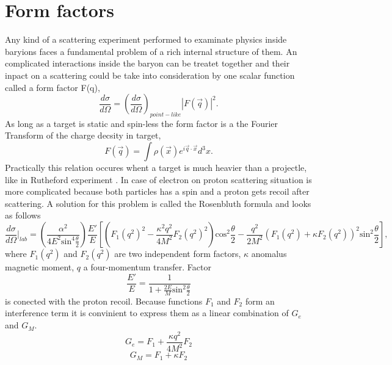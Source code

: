 \section{Form factors}
Any kind of a scattering experiment performed to examinate physics inside baryions faces a fundamental problem of a rich internal structure of them. An complicated interactions inside the baryon can be treatet together and their inpact on a scattering could be take into consideration by one scalar function called a form factor F(q),
\begin{equation}
  \frac{d \sigma}{d \Omega}=\left( \frac{d \sigma}{d \Omega}\right)_{point-like} |F(\vec{q})|^2.
\end{equation}
As long as a target is static and spin-less the form factor is a the Fourier Transform of the charge decsity in target,
\begin{equation}
  F(\vec{q})=\int \rho(\vec{x}) e^{i \vec{q} \cdot \vec{x}}d^3x.
\end{equation}
Practically this relation occures whent a target is much heavier than a projectle, like in Rutheford experiment \cite{Rutheford}. In case of electron on proton scattering situation is more complicated because both particles has a spin and a proton gets recoil after scattering. A solution for this problem is called the Rosenbluth formula and looks as follows
\begin{equation}
  \frac{d \sigma}{d \Omega}\bigg|_{lab}=\left(\frac{\alpha^2}{4E^2 \mathrm{sin}^4 \frac{\theta}{2}}\right) \frac{E'}{E} \left[ \left(F_1(q^2)^2- \frac{\kappa^2 q^2}{4M^2} F_2(q^2)^2\right) \mathrm{cos}^2\frac{\theta}{2}-\frac{q^2}{2M^2} \left(F_1(q^2) + \kappa F_2(q^2)\right)^2 \mathrm{sin}^2 \frac{\theta}{2} \right],
\end{equation}
where $F_1(q^2)$ and $F_2(q^2)$ are two independent form factors, $\kappa$ anomalus magnetic moment, $q$ a four-momentum transfer. Factor
\begin{equation}
  \frac{E'}{E}=\frac{1}{1+\frac{2E}{M}\mathrm{sin}^2\frac{\theta}{2}}
\end{equation}
is conected with the proton recoil. Because functions $F_1$ and $F_2$ form an interference term it is convinient to express them as a linear combination of $G_e$ and $G_M$.
\begin{equation}
  G_e=F_1+\frac{\kappa q^2}{4M^2}F_2
\end{equation}
\begin{equation}
  G_M=F_1+\kappa F_2
\end{equation}

